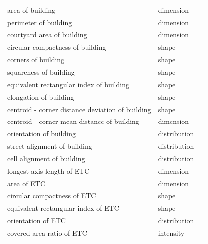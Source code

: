 \documentclass[fleqn,10pt]{wlscirep}
\begin{document}
\begin{longtable}{lll}
    \bottomrule
    \endlastfoot
                                        area of building &    dimension &    \cite{hallowell2013} \\
                                    perimeter of building &    dimension & \cite{vanderhaegen2017} \\
                            courtyard area of building &    dimension &     \cite{schirmer2015} \\
                        circular compactness of building &        shape & \cite{dibble2019origin} \\
                                    corners of building &        shape &    \cite{steiniger2008} \\
                                squareness of building &        shape &    \cite{steiniger2008} \\
                equivalent rectangular index of building &        shape &    \cite{basaraner2017} \\
                                elongation of building &        shape &    \cite{steiniger2008} \\
        centroid - corner distance deviation of building &        shape &  \cite{fleischmann2021} \\
            centroid - corner mean distance of building &    dimension &     \cite{schirmer2015} \\
                                orientation of building & distribution &     \cite{schirmer2015} \\
                            street alignment of building & distribution &     \cite{schirmer2015} \\
                            cell alignment of building & distribution &  \cite{fleischmann2021} \\
                            longest axis length of ETC &    dimension &  \cite{fleischmann2021} \\
                                            area of ETC &    dimension &     \cite{hamaina2012a} \\
                            circular compactness of ETC &        shape &  \cite{fleischmann2021} \\
                    equivalent rectangular index of ETC &        shape &  \cite{fleischmann2021} \\
                                    orientation of ETC & distribution &  \cite{fleischmann2021} \\
                                covered area ratio of ETC &    intensity &      \cite{hamaina2013} \\

\end{longtable}
\end{document}
